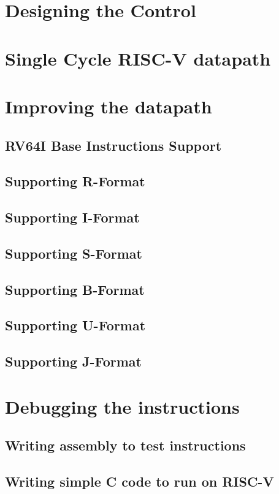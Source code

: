 \section{Designing the Control}
    
\section{Single Cycle RISC-V datapath}

\section{Improving the datapath} 

    \subsection{RV64I Base Instructions Support}

    \subsection{Supporting R-Format}
    
    \subsection{Supporting I-Format}
    
    \subsection{Supporting S-Format}
    
    \subsection{Supporting B-Format}
    
    \subsection{Supporting U-Format}
    
    \subsection{Supporting J-Format}
    
\section{Debugging the instructions}

    \subsection{Writing assembly to test instructions}
    
    \subsection{Writing simple C code to run on RISC-V}
    
    
    

    